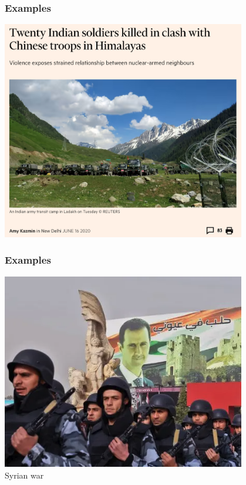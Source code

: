 \documentclass[aspectratio=43]{beamer}
\begin{document}
\begin{frame}
\frametitle{Examples}
\centering

\includegraphics[width = 0.8\textwidth]{img/ft_himalaya}\\

\end{frame}

\begin{frame}
\frametitle{Examples}
\centering

\includegraphics[width = 0.8\textwidth]{img/syria}\\
Syrian war

\end{frame}
\end{document}

